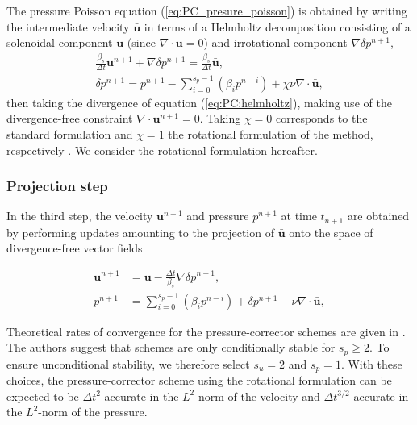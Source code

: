 The pressure Poisson equation (\ref{eq:PC_presure_poisson}) is obtained by
writing the intermediate velocity $\bar{\bm{u}}$ in terms of a Helmholtz
decomposition consisting of a solenoidal component $\bm{u}$ (since $\nabla \cdot
\bm{u}= 0$) and irrotational component $\nabla \delta p^{n+1}$,
\begin{eqnarray}
  \frac{\beta_s}{\Delta t} \bm{u}^{n+1} + \nabla \delta p^{n+1} =
  \frac{\beta_s}{\Delta t} \bar{\bm{u}}, \label{eq:PC:helmholtz} \\
  \delta p^{n+1} = p^{n+1} 
    - \sum_{i=0}^{s_p-1}\left(\beta_i p^{n-i}\right) 
    + \chi \nu \nabla \cdot \bar{\bm{u}},
\end{eqnarray}
then taking the divergence of equation (\ref{eq:PC:helmholtz}), making use of the divergence-free constraint $\nabla \cdot \bm{u}^{n+1} = 0 $. Taking $\chi=0$ corresponds to the standard formulation and $\chi=1$ the rotational formulation of the method, respectively \cite{guermond_overview_2006}. We consider the rotational formulation hereafter.  

\subsubsection{Projection step}
In the third step, the velocity $\bm{u}^{n+1}$ and pressure $p^{n+1}$ at time $t_{n+1}$ are obtained by performing updates amounting to the projection of $\bar{\bm{u}}$ onto the space of divergence-free vector fields

\begin{align}
  \bm{u}^{n+1} &= \bar{\bm{u}} - \frac{\Delta t}{\beta_s} \nabla \delta p^{n+1}, \\
  p^{n+1} &= \sum_{i=0}^{s_p-1} \left(\beta_i p^{n-i}\right) 
  + \delta p^{n+1} 
  - \nu \nabla \cdot \bar{\bm{u}},
\end{align}

Theoretical rates of convergence for the pressure-corrector schemes are given in \cite{guermond_overview_2006}.
The authors suggest that schemes are only conditionally stable for $s_p \geq 2$.
To ensure unconditional stability, we therefore select $s_u = 2$ and $s_p = 1$.
With these choices, the pressure-corrector scheme using the rotational formulation can be expected to be $\Delta t^2$ accurate in the $L^2$-norm of the velocity and $\Delta t^{3/2}$ accurate in the $L^2$-norm of the pressure.

